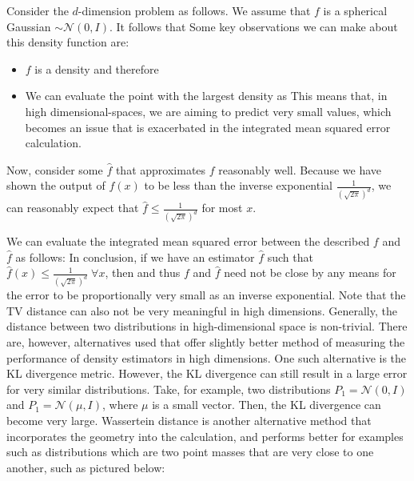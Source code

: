 Consider the $d$-dimension problem as follows. We assume that $f$ is a spherical Gaussian $\sim \mathcal{N}(0, I)$. It follows that 
Some key observations we can make about this density function are:
\begin{itemize}
	\item $f$ is a density and therefore 
	\item We can evaluate the point with the largest density as
	This means that, in high dimensional-spaces, we are aiming to predict very small values, which becomes an issue that is exacerbated in the integrated mean squared error calculation.
\end{itemize}
Now, consider some $\hat{f}$ that approximates $f$ reasonably well. Because we have shown the output of $f(x)$ to be less than the inverse exponential $\frac{1}{\left(\sqrt{2\pi}\right)^d}$, we can reasonably expect that $\hat{f} \leq \frac{1}{\left(\sqrt{2\pi}\right)^d}$ for most $x$.

We can evaluate the integrated mean squared error between the described $f$ and $\hat{f}$ as follows:
In conclusion, if we have an estimator $\hat{f}$ such that $\hat{f}(x) \leq \frac{1}{\left(\sqrt{2\pi}\right)^d} \; \forall x$, then 
and thus $f$ and $\hat{f}$ need not be close by any means for the error to be proportionally very small as an inverse exponential. Note that the TV distance can also not be very meaningful in high dimensions. Generally, the distance between two distributions in high-dimensional space is non-trivial. There are, however, alternatives used that offer slightly better method of measuring the performance of density estimators in high dimensions. One such alternative is the KL divergence metric. However, the KL divergence can still result in a large error for very similar distributions. Take, for example, two distributions $P_1 = \mathcal{N}(0, I)$ and  $P_1 = \mathcal{N}(\mu, I)$, where $\mu$ is a small vector. Then, the KL divergence can become very large. Wassertein distance is another alternative method that incorporates the geometry into the calculation, and performs better for examples such as distributions which are two point masses that are very close to one another, such as pictured below: 

